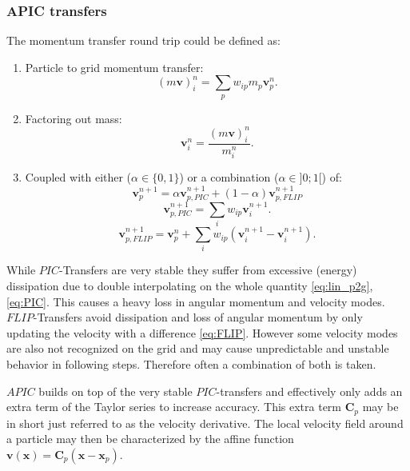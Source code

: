\documentclass[m,times]{cgMA}
\begin{document}
\subsubsection{APIC transfers}\label{sec:apic}
The momentum transfer round trip could be defined as:
\begin{enumerate}
  \item Particle to grid momentum transfer:
    \begin{equation}\label{eq:lin_p2g}
      (m\boldsymbol{v})_i^n = \sum_p w_{ip}m_p\boldsymbol{v}^n_p.
    \end{equation}
  \item Factoring out mass:
    \begin{equation}
      \boldsymbol{v}_i^n = \frac{(m\boldsymbol{v})_i^n}{m_i^n}.
    \end{equation}
  \item Coupled with either ($\alpha \in \{0,1\}$) or a combination ($\alpha \in ]0;1[$) of:
    \begin{equation}
      \boldsymbol{v}_p^{n+1} = \alpha\boldsymbol{v}_{p,{PIC}}^{n+1} + (1-\alpha)\boldsymbol{v}_{p,{FLIP}}^{n+1}
    \end{equation}
    \begin{equation}\label{eq:PIC}
      \boldsymbol{v}_{p,{PIC}}^{n+1} = \sum_i w_{ip}\boldsymbol{v}_i^{n+1}.
    \end{equation}
    \begin{equation}\label{eq:FLIP}
      \boldsymbol{v}_{p,{FLIP}}^{n+1} = \boldsymbol{v}_p^{n} + \sum_i w_{ip}(\boldsymbol{v}_i^{n+1}-\boldsymbol{v}_i^{n+1}).
    \end{equation}
\end{enumerate}
While $PIC$-Transfers are very stable they suffer from excessive (energy) dissipation due to double interpolating on the whole quantity \ref{eq:lin_p2g},\ref{eq:PIC}. This causes a heavy loss in angular momentum and velocity modes.
$FLIP$-Transfers avoid dissipation and loss of angular momentum by only updating the velocity with a difference \ref{eq:FLIP}. However some velocity modes are also not recognized on the grid and may cause unpredictable and unstable behavior in following steps. Therefore often a combination of both is taken.

$APIC$ builds on top of the very stable $PIC$-transfers and effectively only adds an extra term of the Taylor series to increase accuracy. This extra term $\boldsymbol{C}_p$ may be in short just referred to as the velocity derivative. The local velocity field around a particle may then be characterized by the affine function $\boldsymbol{v}(\boldsymbol{x}) = \boldsymbol{C}_p(\boldsymbol{x}-\boldsymbol{x}_p)$.
\end{document}

